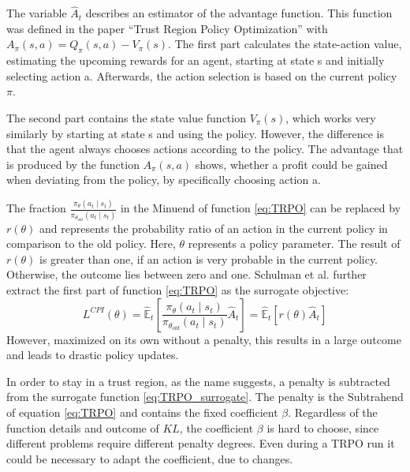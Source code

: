 The variable $\hat{A}_{t}$ describes an estimator of the advantage function. This function was defined in the paper ``Trust Region Policy Optimization'' \cite{scle15} with \\ $A_\pi(s,a) = Q_\pi(s,a)-V_\pi(s)$. The first part calculates the state-action value, estimating the upcoming rewards for an agent, starting at state s and initially selecting action a. Afterwards, the action selection is based on the current policy $\pi$. 

The second part contains the state value function $V_\pi(s)$, which works very similarly by starting at state s and using the policy. However, the difference is that the agent always chooses actions according to the policy. The advantage that is produced by the function $A_\pi(s,a)$ shows, whether a profit could be gained when deviating from the policy, by specifically choosing action a.

The fraction $\frac{\pi_{\theta}(a_{t} \mid s_{t})}{\pi_{\theta_{old}}(a_{t} \mid s_{t})}$ in the Minuend of function \eqref{eq:TRPO} can be replaced by $r(\theta)$
and represents the probability ratio of an action in the current policy in comparison to the old policy. Here,  $\theta$ represents a policy parameter. The result of $r(\theta)$ is greater than one, if an action is very probable in the current policy. Otherwise, the outcome lies between zero and one. Schulman et al. further extract the first part of function \eqref{eq:TRPO} as the surrogate objective:
\begin{equation}\label{eq:TRPO_surrogate}
    L^{CPI}(\theta) = \hat{\mathbb{E}}_{t} \left[ \frac{\pi_{\theta}(a_{t} \mid s_{t})}{\pi_{\theta_{old}}(a_{t} \mid s_{t})} \hat{A}_{t} \right]
    = \hat{\mathbb{E}}_{t} \left[ r(\theta)\hat{A}_{t} \right]
\end{equation}
However, maximized on its own without a penalty, this results in a large outcome and leads to drastic policy updates.

In order to stay in a trust region, as the name suggests, a penalty is subtracted from the surrogate function \eqref{eq:TRPO_surrogate}. The penalty is the Subtrahend of equation \eqref{eq:TRPO} and contains the fixed coefficient $\beta$. Regardless of the function details and outcome of $KL$, the coefficient $\beta$ is hard to choose, since different problems require different penalty degrees. Even during a TRPO run it could be necessary to adapt the coefficient, due to changes.

